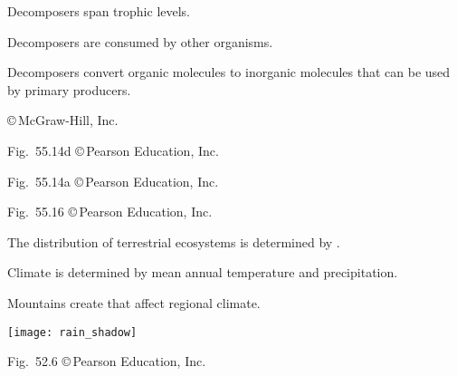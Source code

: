 \documentclass[t]{beamer}
\begin{document}
{
\begin{frame}[t]{}

	\vspace*{3\baselineskip}
	
	\hspace*{70mm}\parbox{45mm}{\raggedright Decomposers span trophic levels.}
	
	\bigskip
	
	\hspace*{70mm}\parbox{45mm}{\raggedright Decomposers are consumed by other organisms.}
		
	\bigskip
	
	\hspace*{70mm}\parbox{46mm}{\raggedright Decomposers convert organic molecules to inorganic molecules that can be used by primary producers.}

	\vfilll
	
	\hfill \tiny \copyright\,McGraw-Hill, Inc.
\end{frame}
}
%
{
\begin{frame}[b]

	\hfill \tiny Fig.~55.14d \copyright\,Pearson Education, Inc.
\end{frame}
}
%
{
\begin{frame}[b]

	\hfill \tiny Fig.~55.14a \copyright\,Pearson Education, Inc.
\end{frame}
}
%
{
\begin{frame}[b]

	\hfill \tiny Fig.~55.16 \copyright\,Pearson Education, Inc.
\end{frame}
}
{
\begin{frame}[b]{The distribution of terrestrial ecosystems is determined by .}

\end{frame}
}
%
{
\begin{frame}[b]{Climate is determined by mean annual temperature and precipitation.}

\end{frame}
}
%
\begin{frame}[t]{Mountains create  that affect regional climate.}
	
	\bigskip
	
	\texttt{[image: rain\_shadow]}
	
	\vfilll
	
	\hfill \tiny Fig.~52.6 \copyright\,Pearson Education, Inc.
\end{frame}
%
{
\begin{frame}[b]

\end{frame}
}

\end{document}
